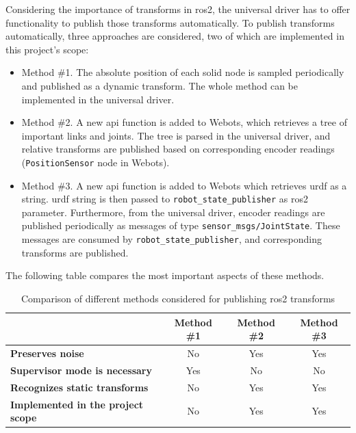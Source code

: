 Considering the importance of transforms in \ac{ros2}, the universal driver has to offer functionality to publish those transforms automatically.
To publish transforms automatically, three approaches are considered, two of which are implemented in this project's scope:
\begin{itemize}
    \item Method \#1. The absolute position of each solid node is sampled periodically and published as a dynamic transform. The whole method can be implemented in the universal driver.
    \item Method \#2. A new \ac{api} function is added to Webots, which retrieves a tree of important links and joints. The tree is parsed in the universal driver, and relative transforms are published based on corresponding encoder readings (\texttt{PositionSensor} node in Webots). 
    \item Method \#3. A new \ac{api} function is added to Webots which retrieves \ac{urdf} as a string. \ac{urdf} string is then passed to \texttt{robot\_state\_publisher} as \ac{ros2} parameter. Furthermore, from the universal driver, encoder readings are published periodically as messages of type \texttt{sensor\_msgs/JointState}. These messages are consumed by \texttt{robot\_state\_publisher}, and corresponding transforms are published.
\end{itemize}

The following table compares the most important aspects of these methods.

\begin{table}[H]
    \begin{adjustwidth}{-1.5in}{-1.5in}
    \centering
    \begin{tabular}{|l|c|c|c|}
        \hline
        & \textbf{Method \#1} & \textbf{Method \#2} & \textbf{Method \#3}  \\
        \hline
        \textbf{Preserves noise} & No & Yes & Yes \\
        \hline
        \textbf{Supervisor mode is necessary} & Yes & No & No \\
        \hline
        \textbf{Recognizes static transforms} & No & Yes & Yes \\
        \hline
        \textbf{Implemented in the project scope} & No & Yes & Yes \\
        \hline
    \end{tabular}
    \caption{Comparison of different methods considered for publishing \ac{ros2} transforms}
    \label{tab:generalization:transforms_comparison}
    \end{adjustwidth}
\end{table}

